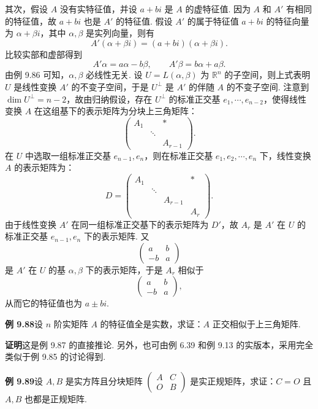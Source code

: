 \documentclass[UTF8,12pt,a4paper,fontset=fandol]{ctexart}
\begin{document}
其次，假设 $A$ 没有实特征值，并设 $a+bi$ 是 $A$ 的虚特征值. 因为 $A$ 和 $A'$ 有相同的特征值，故 $a+bi$ 也是 $A'$ 的特征值. 假设 $A'$ 的属于特征值 $a+bi$ 的特征向量为 $\alpha+\beta i$，其中 $\alpha,\beta$ 是实列向量，则有
\[
A'(\alpha+\beta i)=(a+bi)(\alpha+\beta i).
\]
比较实部和虚部得到
\[
A'\alpha=a\alpha-b\beta,\qquad A'\beta=b\alpha+a\beta.
\]
由例 9.86 可知，$\alpha,\beta$ 必线性无关. 设 $U=L(\alpha,\beta)$ 为 $\mathbb{R}^n$ 的子空间，则上式表明 $U$ 是线性变换 $A'$ 的不变子空间，于是 $U^\perp$ 是 $A'$ 的伴随 $A$ 的不变子空间. 注意到 $\dim U^\perp=n-2$，故由归纳假设，存在 $U^\perp$ 的标准正交基 $e_1,\cdots,e_{n-2}$，使得线性变换 $A$ 在这组基下的表示矩阵为分块上三角矩阵：
\[
\begin{pmatrix}
A_1&&*\\
&\ddots&\\
&&A_{r-1}
\end{pmatrix}.
\]
在 $U$ 中选取一组标准正交基 $e_{n-1},e_n$，则在标准正交基 $e_1,e_2,\cdots,e_n$ 下，线性变换 $A$ 的表示矩阵为：
\[
D=\begin{pmatrix}
A_1&&&*\\
&\ddots&&\\
&&A_{r-1}&\\
&&&A_r
\end{pmatrix}.
\]
由于线性变换 $A'$ 在同一组标准正交基下的表示矩阵为 $D'$，故 $A_r$ 是 $A'$ 在 $U$ 的标准正交基 $e_{n-1},e_n$ 下的表示矩阵. 又
\[
\begin{pmatrix}
a&b\\
-b&a
\end{pmatrix}
\]
是 $A'$ 在 $U$ 的基 $\alpha,\beta$ 下的表示矩阵，于是 $A_r$ 相似于
\[
\begin{pmatrix}
a&b\\
-b&a
\end{pmatrix},
\]
从而它的特征值也为 $a\pm bi$.

\noindent\textbf{例 9.88}\quad 设 $n$ 阶实矩阵 $A$ 的特征值全是实数，求证：$A$ 正交相似于上三角矩阵.

\noindent\textbf{证明}\quad 这是例 9.87 的直接推论. 另外，也可由例 6.39 和例 9.13 的实版本，采用完全类似于例 9.85 的讨论得到.

\noindent\textbf{例 9.89}\quad 设 $A,B$ 是实方阵且分块矩阵 $\begin{pmatrix}A&C\\O&B\end{pmatrix}$ 是实正规矩阵，求证：$C=O$ 且 $A,B$ 也都是正规矩阵.
\end{document}
